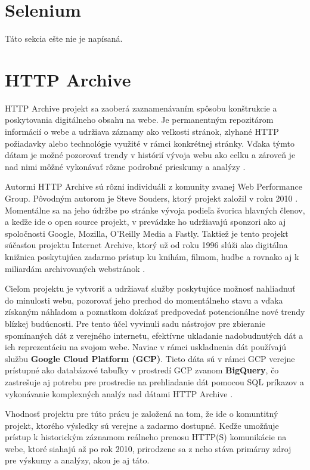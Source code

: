\section{Selenium}
\label{selenium}

Táto sekcia ešte nie je napísaná.

\section{HTTP Archive}
\label{httparchive}

HTTP Archive projekt sa zaoberá zaznamenávaním spôsobu konštrukcie a poskytovania digitálneho obsahu na webe. Je permanentným repozitárom informácií o webe a udržiava záznamy ako veľkosti
stránok, zlyhané HTTP požiadavky alebo technológie využité v rámci konkrétnej stránky. Vďaka týmto dátam je možné pozorovať trendy v histórií vývoja webu ako celku a zároveň je nad nimi môžné vykonávať
rôzne podrobné prieskumy a analýzy \cite{httparchive-about}. 

Autormi HTTP Archive sú rôzni individuáli z komunity zvanej Web Performance Group. Pôvodným autorom je Steve Souders, ktorý projekt založil v roku 2010 \cite{httparchive-faq}.
Momentálne sa na jeho údržbe po stránke vývoja podieľa švorica hlavných členov, a keďže ide o open source projekt, v prevádzke ho udržiavajú sponzori ako aj spoločnosti Google, Mozilla, O'Reilly Media a Fastly.
Taktiež je tento projekt súčasťou projektu Internet Archive, ktorý už od roku 1996 slúži ako digitálna knižnica poskytujúca zadarmo prístup ku knihám, filmom, hudbe a rovnako aj k miliardám archivovaných webstránok \cite{httparchive-about}.

Cieľom projektu je vytvoriť a udržiavať služby poskytujúce možnosť nahliadnuť do minulosti webu, pozorovať jeho prechod do momentálneho stavu a vďaka získaným náhľadom a poznatkom dokázať
predpovedať potencionálne nové trendy blízkej budúcnosti. 
Pre tento účel vyvinuli sadu nástrojov pre zbieranie spomínaných dát z verejného internetu, efektívne ukladanie nadobudnutých dát a ich reprezentáciu na svojom webe.
Naviac v rámci uskladnenia dát používajú službu \textbf{Google Cloud Platform (GCP)}.
Tieto dáta sú v rámci GCP verejne prístupné ako databázové tabuľky v prostredí GCP zvanom \textbf{BigQuery}, čo zastrešuje aj potrebu pre prostredie na prehliadanie dát pomocou SQL príkazov 
a vykonávanie komplexných analýz nad dátami HTTP Archive \cite{httparchive-faq}. 

Vhodnosť projektu pre túto prácu je založená na tom, že ide o komuntitný projekt, ktorého výsledky sú verejne a zadarmo dostupné. Keďže umožňuje prístup k historickým záznamom reálneho prenosu HTTP(S) komunikácie na webe, ktoré siahajú až po rok 2010, prirodzene sa z neho stáva primárny zdroj pre výskumy a analýzy, akou je aj táto.

